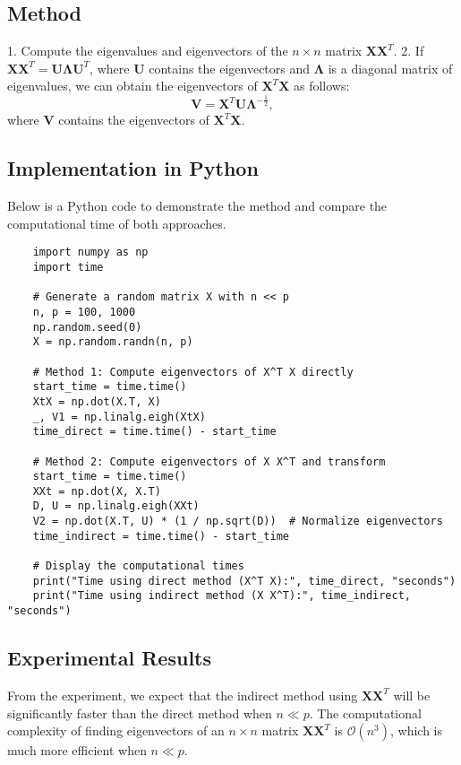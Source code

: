 \documentclass[11pt]{article}
\begin{document}
	\subsection*{Method}
	1. Compute the eigenvalues and eigenvectors of the $n \times n$ matrix $\mathbf{X} \mathbf{X}^T$.
	2. If $\mathbf{X} \mathbf{X}^T = \mathbf{U} \mathbf{\Lambda} \mathbf{U}^T$, where $\mathbf{U}$ contains the eigenvectors and $\mathbf{\Lambda}$ is a diagonal matrix of eigenvalues, we can obtain the eigenvectors of $\mathbf{X}^T \mathbf{X}$ as follows:
	   \[
	   \mathbf{V} = \mathbf{X}^T \mathbf{U} \mathbf{\Lambda}^{-\frac{1}{2}},
	   \]
	   where $\mathbf{V}$ contains the eigenvectors of $\mathbf{X}^T \mathbf{X}$.
	
	\subsection*{Implementation in Python}
	Below is a Python code to demonstrate the method and compare the computational time of both approaches.
	
	\begin{verbatim}
	import numpy as np
	import time
	
	# Generate a random matrix X with n << p
	n, p = 100, 1000
	np.random.seed(0)
	X = np.random.randn(n, p)
	
	# Method 1: Compute eigenvectors of X^T X directly
	start_time = time.time()
	XtX = np.dot(X.T, X)
	_, V1 = np.linalg.eigh(XtX)
	time_direct = time.time() - start_time
	
	# Method 2: Compute eigenvectors of X X^T and transform
	start_time = time.time()
	XXt = np.dot(X, X.T)
	D, U = np.linalg.eigh(XXt)
	V2 = np.dot(X.T, U) * (1 / np.sqrt(D))  # Normalize eigenvectors
	time_indirect = time.time() - start_time
	
	# Display the computational times
	print("Time using direct method (X^T X):", time_direct, "seconds")
	print("Time using indirect method (X X^T):", time_indirect, "seconds")
	\end{verbatim}
	
	\subsection*{Experimental Results}
	From the experiment, we expect that the indirect method using $\mathbf{X} \mathbf{X}^T$ will be significantly faster than the direct method when $n \ll p$. The computational complexity of finding eigenvectors of an $n \times n$ matrix $\mathbf{X} \mathbf{X}^T$ is $\mathcal{O}(n^3)$, which is much more efficient when $n \ll p$.
	
\end{document}
